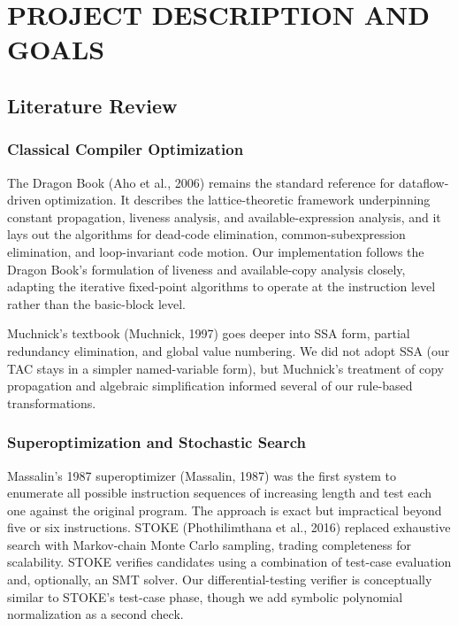 \documentclass[12pt,a4paper]{report}
\begin{document}
\chapter{PROJECT DESCRIPTION AND GOALS}

\section{Literature Review}

\subsection{Classical Compiler Optimization}

The Dragon Book (Aho et al., 2006) remains the standard reference for dataflow-driven optimization. It describes the lattice-theoretic framework underpinning constant propagation, liveness analysis, and available-expression analysis, and it lays out the algorithms for dead-code elimination, common-subexpression elimination, and loop-invariant code motion. Our implementation follows the Dragon Book's formulation of liveness and available-copy analysis closely, adapting the iterative fixed-point algorithms to operate at the instruction level rather than the basic-block level.

Muchnick's textbook (Muchnick, 1997) goes deeper into SSA form, partial redundancy elimination, and global value numbering. We did not adopt SSA (our TAC stays in a simpler named-variable form), but Muchnick's treatment of copy propagation and algebraic simplification informed several of our rule-based transformations.

\subsection{Superoptimization and Stochastic Search}

Massalin's 1987 superoptimizer (Massalin, 1987) was the first system to enumerate all possible instruction sequences of increasing length and test each one against the original program. The approach is exact but impractical beyond five or six instructions. STOKE (Phothilimthana et al., 2016) replaced exhaustive search with Markov-chain Monte Carlo sampling, trading completeness for scalability. STOKE verifies candidates using a combination of test-case evaluation and, optionally, an SMT solver. Our differential-testing verifier is conceptually similar to STOKE's test-case phase, though we add symbolic polynomial normalization as a second check.
\end{document}
